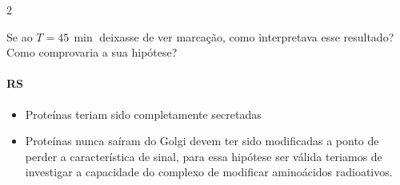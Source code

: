 \documentclass[\mainfilename]{subfiles}
\begin{document}
\begin{questionBox}2{}
    
    Se ao \(T=45\,\unit{\min}\) deixasse de ver marcação, como interpretava esse resultado? Como comprovaria a sua hipótese?

    \paragraph*{RS}
    \begin{itemize}
        \item Proteínas teriam sido completamente secretadas
        \item Proteínas nunca saíram do Golgi devem ter sido modificadas a ponto de perder a característica de sinal, para essa hipótese ser válida teriamos de investigar a capacidade do complexo de modificar aminoácidos radioativos.
    \end{itemize}
    
\end{questionBox}
\end{document}
